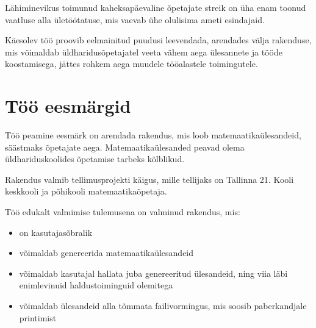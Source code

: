 Lähiminevikus toimunud kaheksapäevaline õpetajate streik \cite{hm-opetajate-streik} on üha enam toonud vaatluse alla ületöötatuse, mis vaevab ühe olulisima ameti esindajaid.

Käesolev töö proovib eelmainitud puudusi leevendada, arendades välja rakenduse, mis võimaldab üldharidusõpetajatel veeta vähem aega ülesannete ja tööde koostamisega, jättes rohkem aega muudele tööalastele toimingutele.

\section{Töö eesmärgid}

Töö peamine eesmärk on arendada rakendus, mis loob matemaatikaülesandeid, säästmaks õpetajate aega. Matemaatikaülesanded peavad olema üldhariduskoolides õpetamise tarbeks kõlblikud.

Rakendus valmib tellimusprojekti käigus, mille tellijaks on Tallinna 21. Kooli keskkooli ja põhikooli matemaatikaõpetaja.

Töö edukalt valmimise tulemusena on valminud rakendus, mis:

\begin{itemize}
  \item on kasutajasõbralik
  \item võimaldab genereerida matemaatikaülesandeid
  \item võimaldab kasutajal hallata juba genereeritud ülesandeid, ning viia läbi enimlevinuid haldustoiminguid olemitega
  \item võimaldab ülesandeid alla tõmmata failivormingus, mis soosib paberkandjale printimist
\end{itemize}

